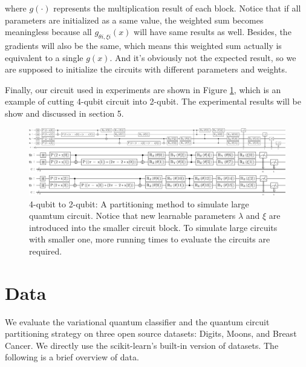 \documentclass[sigconf]{acmart}
\begin{document}
where $g(\cdot)$ represents the multiplication result of each block. Notice that if all parameters are initialized as a same value, the weighted sum becomes meaningless because all $g_{\theta i, \xi i}(x)$ will have same results as well. Besides, the gradients will also be the same, which means this weighted sum actually is equivalent to a single $g(x)$. And it's obviously not the expected result, so we are supposed to initialize the circuits with different parameters and weights.

Finally, our circuit used in experiments are shown in Figure \ref{fig:cutting}, which is an example of cutting 4-qubit circuit into 2-qubit. The experimental results will be show and discussed in section 5.
\begin{figure}[!ht]
	\begin{minipage}[t]{0.9\textwidth}%
		\centering
		\includegraphics[width=\textwidth]{lar.png}
	\end{minipage}
	\begin{minipage}[t]{0.9\textwidth}%
		\centering
		\includegraphics[width=\textwidth]{par1.png}
	\end{minipage}
	\begin{minipage}[t]{0.9\textwidth}%
	    \centering
		\includegraphics[width=\textwidth]{par2.png}
	\end{minipage}
	\caption{4-qubit to 2-qubit: {\small \textnormal{A partitioning method to simulate large quamtum circuit. Notice that new learnable parameters $\lambda$ and $\xi$ are introduced into the smaller circuit block. To simulate large circuits with smaller one, more running times to evaluate the circuits are required.}} }
	\label{fig:cutting}
\end{figure}

\section{Data}
We evaluate the variational quantum classifier and the quantum circuit partitioning strategy on three open source datasets: Digits, Moons, and Breast Cancer. We directly use the scikit-learn's built-in version of datasets. The following is a brief overview of data.
\end{document}
